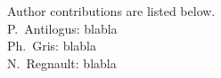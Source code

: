 Author contributions are listed below. \\
P.~Antilogus: blabla \\
Ph.~Gris: blabla \\
N.~Regnault: blabla \\
